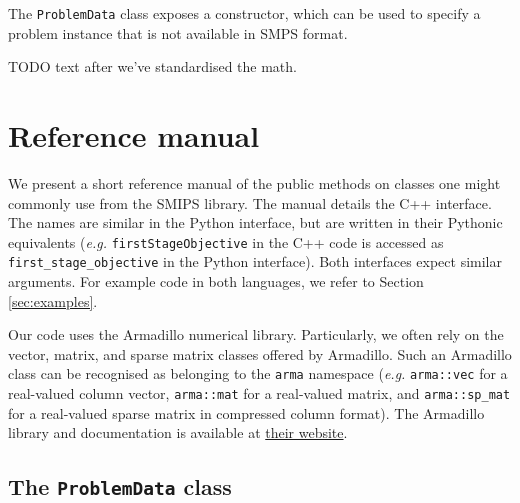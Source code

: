 \documentclass[12pt, english]{article}
\begin{document}
The \texttt{ProblemData} class exposes a constructor, which can be used to specify a problem instance that is not available in SMPS format.

TODO text after we've standardised the math.

\section{Reference manual}
\label{sec:reference_manual}

We present a short reference manual of the public methods on classes one might commonly use from the
SMIPS library. The manual details the C++ interface. The names are similar in the Python interface, but are written in their Pythonic equivalents (\textit{e.g.} \texttt{firstStageObjective} in the C++ code is accessed as \texttt{first\_stage\_objective} in the Python interface). Both interfaces expect similar arguments. For example code in both languages, we refer to Section \ref{sec:examples}.

Our code uses the Armadillo numerical library. Particularly, we often rely on the vector, matrix, and sparse matrix classes offered by Armadillo. Such an Armadillo class can be recognised as belonging to the \texttt{arma} namespace (\textit{e.g.} \texttt{arma::vec} for a real-valued column vector, \texttt{arma::mat} for a real-valued matrix, and \texttt{arma::sp\_mat} for a real-valued sparse matrix in compressed column format). The Armadillo library and documentation is available at \href{http://arma.sourceforge.net/}{their website}.

\subsection{The \texttt{ProblemData} class}
\label{subsec:problem_class}
\end{document}
